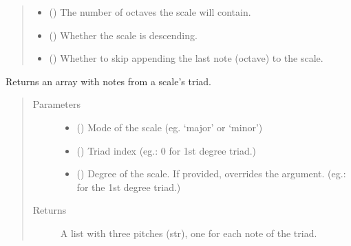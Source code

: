 \documentclass[letterpaper,10pt,english]{sphinxmanual}
\begin{document}
\begin{fulllineitems}
\begin{fulllineitems}
\begin{quote}
\begin{description}
\begin{itemize}
\item {} 
 () \textendash{} The number of octaves the scale will contain.

\item {} 
 () \textendash{} Whether the scale is descending.

\item {} 
 () \textendash{} Whether to skip appending the last
note (octave) to the scale.

\end{itemize}

\end{description}\end{quote}

\end{fulllineitems}


\begin{fulllineitems}
\label{\detokenize{index:birdears.scale.ChromaticScale.get_triad}}
Returns an array with notes from a scale’s triad.
\begin{quote}\begin{description}
\item[{Parameters}] \leavevmode\begin{itemize}
\item {} 
 () \textendash{} Mode of the scale (eg. ‘major’ or ‘minor’)

\item {} 
 () \textendash{} Triad index (eg.: 0 for 1st degree triad.)

\item {} 
 () \textendash{} Degree of the scale. If provided, overrides the
 argument. (eg.:  for the 1st degree triad.)

\end{itemize}

\item[{Returns}] \leavevmode
A list with three pitches (str), one for each note of the triad.

\end{description}\end{quote}

\end{fulllineitems}


\end{fulllineitems}
\end{document}
